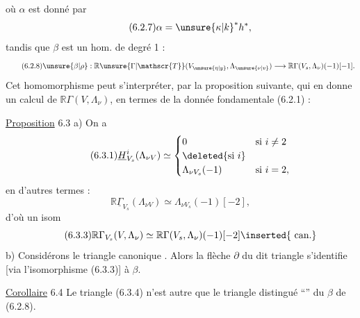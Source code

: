 
où $\alpha$  est donné par
\[
\tag*{(6.2.7)}\alpha={\unsure{\kappa|k}}^*h^*,
\]
tandis que $\beta$ est un hom. de degré 1 :
\[
\tag*{(6.2.8)}\unsure{\beta|\rho}:\mathbb{R}\unsure{\Gamma|\mathscr{T}}(V_{\unsure{\eta|y}},\Lambda_{\unsure{\nu|v}})\longrightarrow\mathbb{R}\Gamma(V_s,\Lambda_\nu)(-1)[-1].
\]
 Cet homomorphisme peut s'interpréter, par la proposition suivante, qui en  donne un  calcul de $\mathbb{R}\Gamma(V,\Lambda_\nu)$, en termes de la donnée fondamentale  (6.2.1) :

\uline{Proposition} 6.3 a) On a
\[
\tag*{(6.3.1)}\underline{H}^i_{V_s}(\Lambda_{\nu V})\simeq\begin{cases}
0&\text{si }i\ne2\\
\deleted{\text{si }i}&\\
\Lambda_{\nu V_s}(-1)&\text{si }i=2,
\end{cases}
\]
en d'autres termes :
\[
\tag*{(6.3.2)}\mathbb{R}\underline\Gamma_{V_s}(\Lambda_{\nu V})\simeq\Lambda_{\nu V_s}(-1)[-2],
\]
d'où un isom
\[
\tag*{(6.3.3)}\mathbb{R}\Gamma_{V_s}(V,\Lambda_\nu)\simeq\mathbb{R}\Gamma(V_s,\Lambda_\nu)(-1)[-2]\inserted{\text{ can.}}
\]
b) Considérons le triangle canonique
.
Alors la flèche $\partial$ du dit triangle s'identifie [via l'isomorphisme (6.3.3)] à $\beta$. 

\uline{Corollaire} 6.4  Le triangle (6.3.4) n'est autre que le triangle distingué   ``{}'' du $\beta$ de (6.2.8).
